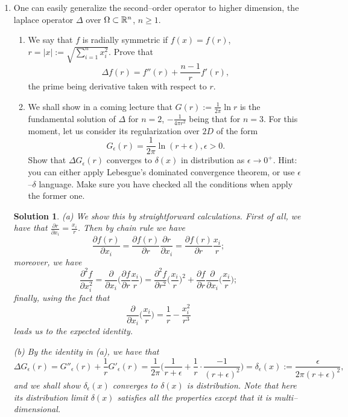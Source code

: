 \documentclass[6pt]{article}
\newtheorem{solution}{Solution}
\numberwithin{equation}{section}
\def\mathbb{\Bbb}
\begin{document}
\begin{enumerate}
\item One can easily generalize the second--order operator to higher dimension, the laplace operator $\Delta$ over $\Omega\subset\mathbb R^n$, $n\geq1$.
\begin{enumerate}
  \item We say that $f$  is radially symmetric if $f(x)=f(r)$, $r=|x|:=\sqrt{\sum_{i=1}^n x_i^2}$.  Prove that
  \[\Delta f(r)=f''(r)+\frac{n-1}{r}f'(r),\]
  the prime being derivative taken with respect to $r$.
  \item We shall show in a coming lecture that $G(r):=\frac{1}{2\pi}\ln r$ is the fundamental solution of $\Delta$ for $n=2$, $-\frac{1}{4\pi r^2}$ being that for $n=3$.  For this moment, let us consider its regularization over $2D$ of the form
      \[G_\epsilon(r)=\frac{1}{2\pi}\ln (r+\epsilon),\epsilon>0.\]
      Show that $\Delta G_\epsilon(r)$ converges to $\delta(x)$ in distribution as $\epsilon\rightarrow 0^+$.  Hint: you can either apply Lebesgue's dominated convergence theorem, or use $\epsilon$--$\delta$ language.  Make sure you have checked all the conditions when apply the former one.
\end{enumerate}
\begin{solution}
(a)  We show this by straightforward calculations.  First of all, we have that $\frac{\partial r}{\partial x_i}=\frac{x_i}{r}$.  Then by chain rule we have
\[\frac{\partial f(r)}{\partial x_i}=\frac{\partial f(r)}{\partial r}\frac{\partial r}{\partial x_i}=\frac{\partial f(r)}{\partial r} \frac{x_i}{r};\]
moreover, we have
\[\frac{\partial^2 f}{\partial x_i^2}=\frac{\partial}{\partial x_i}\Big(\frac{\partial f}{\partial r} \frac{x_i}{r}\Big)=\frac{\partial^2 f}{\partial r^2} \big(\frac{x_i}{r}\big)^2+\frac{\partial f}{\partial r}\frac{\partial }{\partial x_i}\big(\frac{x_i}{r}\big);\]
finally, using the fact that
\[\frac{\partial }{\partial x_i}\big(\frac{x_i}{r}\big)=\frac{1}{r}-\frac{x_i^2}{r^3}\]
leads us to the expected identity.

(b)  By the identity in (a), we have that
\[\Delta G_\epsilon(r)=G''_\epsilon(r)+\frac{1}{r}G'_\epsilon(r)=\frac{1}{2\pi}\Big(\frac{1}{r+\epsilon}+\frac{1}{r}\cdot \frac{-1}{(r+\epsilon)^2}\Big)=\delta_\epsilon(x):=\frac{\epsilon}{2\pi(r+\epsilon)^2},\]
and we shall show $\delta_\epsilon(x)$ converges to $\delta(x)$ is distribution.  Note that here its distribution limit $\delta(x)$ satisfies all the properties except that it is multi--dimensional.


\end{solution}
\end{enumerate}
\end{document}
